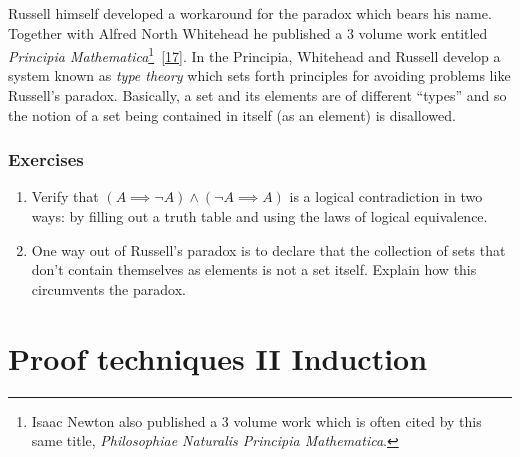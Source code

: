 \documentclass[10pt,]{book}
\theoremstyle{plain}
\theoremstyle{definition}
\theoremstyle{definition}
\numberwithin{equation}{section}
\newcommand{\hint}[1]{ }
\begin{document}
    Russell himself developed a workaround for the paradox which
    bears his name. Together with Alfred North Whitehead he published
    a 3 volume work entitled \emph{Principia Mathematica}\footnote{Isaac Newton
    also published a 3 volume work which is often cited by this same title,
    \emph{Philosophiae Naturalis Principia Mathematica}.\label{fn-29}}~\hyperlink{PM}{[17]}.
    In the Principia, Whitehead and Russell develop a system known as
    \emph{type theory} which sets forth principles for avoiding problems
    like Russell's paradox. Basically, a set and its elements are of
    different ``types'' and so the notion of a set being contained in itself
    (as an element) is disallowed.
\typeout{************************************************}
\typeout{************************************************}
\subsection[{Exercises}]{Exercises}\label{exercises-25}
\leavevmode%
\begin{enumerate}[label=(\alph*)]
\item\hypertarget{li-349}{}
          Verify that \((A \implies {\lnot}A) \land ({\lnot}A \implies A)\)
          is a logical contradiction in two ways:  by filling out a truth table and 
          using the laws of logical equivalence.

          \hint{In order to get started on this you'll need to convert the conditionals into equivalent
          disjunctions.  Recall that \(X \implies Y \; \equiv \; {\lnot}X \lor Y\).}
\item\hypertarget{li-350}{}
          One way out of Russell's paradox is to declare that the collection
          of sets that don't contain themselves as elements is not a set itself.
          Explain how this circumvents the paradox. 

          \hint{If it's not a set then it doesn't necessarily have to have the property that we
          can be \emph{sure} whether an element is in it or not.}
\end{enumerate}
\typeout{************************************************}
\typeout{************************************************}
\chapter[{Proof techniques II \textemdash{} Induction}]{Proof techniques II \textemdash{} Induction}\label{chapter-5}
\typeout{************************************************}
\typeout{************************************************}
\end{document}
